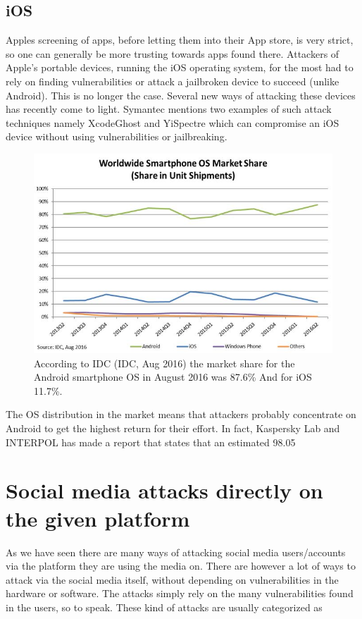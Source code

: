 \subsection{iOS}
Apples screening of apps, before letting them into their App store, is very strict, so one can generally be more trusting towards apps found there. Attackers of Apple’s portable devices, running the iOS operating system, for the most had to rely on finding vulnerabilities or attack a jailbroken device to succeed (unlike Android). This is no longer the case. Several new ways of attacking these devices has recently come to light. Symantec mentions two examples of such attack techniques namely XcodeGhost and YiSpectre which can compromise an iOS device without using vulnerabilities or jailbreaking.
\begin{figure}
\centering
\includegraphics[width=0.8 \textwidth]{fig/smartphone_market_share}
\caption{According to IDC (IDC, Aug 2016) the market share for the Android smartphone OS in August 2016 was 87.6\% And for iOS 11.7\%.\label{fig:smartphone_market_share}}
\end{figure}
The OS distribution in the market means that attackers probably concentrate on Android to get the highest return for their effort. In fact, Kaspersky Lab and INTERPOL has made a report that states that an estimated 98.05%
\section{Social media attacks directly on the given platform}
As we have seen there are many ways of attacking social media users/accounts via the platform they are using the media on. There are however a lot of ways to attack via the social media itself, without depending on vulnerabilities in the hardware or software. The attacks simply rely on the many vulnerabilities found in the users, so to speak. These kind of attacks are usually categorized as 
